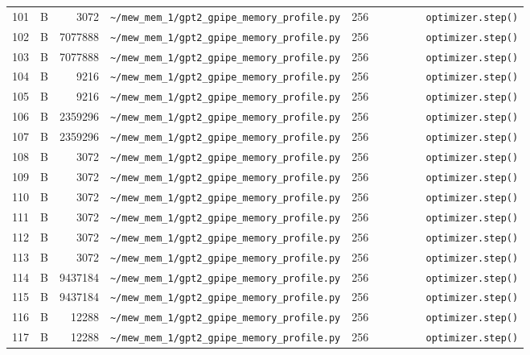 \documentclass{article}
\begin{document}
\begin{longtable}{r l r p{6.5cm} r p{7.0cm}}
101 & B & 3072 & \lstinline|~/mew_mem_1/gpt2_gpipe_memory_profile.py| & 256 & \lstinline|        optimizer.step()| \\
102 & B & 7077888 & \lstinline|~/mew_mem_1/gpt2_gpipe_memory_profile.py| & 256 & \lstinline|        optimizer.step()| \\
103 & B & 7077888 & \lstinline|~/mew_mem_1/gpt2_gpipe_memory_profile.py| & 256 & \lstinline|        optimizer.step()| \\
104 & B & 9216 & \lstinline|~/mew_mem_1/gpt2_gpipe_memory_profile.py| & 256 & \lstinline|        optimizer.step()| \\
105 & B & 9216 & \lstinline|~/mew_mem_1/gpt2_gpipe_memory_profile.py| & 256 & \lstinline|        optimizer.step()| \\
106 & B & 2359296 & \lstinline|~/mew_mem_1/gpt2_gpipe_memory_profile.py| & 256 & \lstinline|        optimizer.step()| \\
107 & B & 2359296 & \lstinline|~/mew_mem_1/gpt2_gpipe_memory_profile.py| & 256 & \lstinline|        optimizer.step()| \\
108 & B & 3072 & \lstinline|~/mew_mem_1/gpt2_gpipe_memory_profile.py| & 256 & \lstinline|        optimizer.step()| \\
109 & B & 3072 & \lstinline|~/mew_mem_1/gpt2_gpipe_memory_profile.py| & 256 & \lstinline|        optimizer.step()| \\
110 & B & 3072 & \lstinline|~/mew_mem_1/gpt2_gpipe_memory_profile.py| & 256 & \lstinline|        optimizer.step()| \\
111 & B & 3072 & \lstinline|~/mew_mem_1/gpt2_gpipe_memory_profile.py| & 256 & \lstinline|        optimizer.step()| \\
112 & B & 3072 & \lstinline|~/mew_mem_1/gpt2_gpipe_memory_profile.py| & 256 & \lstinline|        optimizer.step()| \\
113 & B & 3072 & \lstinline|~/mew_mem_1/gpt2_gpipe_memory_profile.py| & 256 & \lstinline|        optimizer.step()| \\
114 & B & 9437184 & \lstinline|~/mew_mem_1/gpt2_gpipe_memory_profile.py| & 256 & \lstinline|        optimizer.step()| \\
115 & B & 9437184 & \lstinline|~/mew_mem_1/gpt2_gpipe_memory_profile.py| & 256 & \lstinline|        optimizer.step()| \\
116 & B & 12288 & \lstinline|~/mew_mem_1/gpt2_gpipe_memory_profile.py| & 256 & \lstinline|        optimizer.step()| \\
117 & B & 12288 & \lstinline|~/mew_mem_1/gpt2_gpipe_memory_profile.py| & 256 & \lstinline|        optimizer.step()| \\

\end{longtable}
\end{document}
